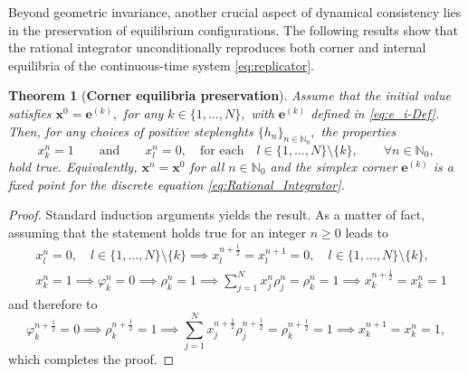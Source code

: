 \documentclass[11pt,letterpaper]{article}
\newtheorem{theorem}{Theorem}[section]
\theoremstyle{remark}
\begin{document}
Beyond geometric invariance, another crucial aspect of dynamical consistency lies in the preservation of equilibrium configurations. The following results show that the rational integrator unconditionally reproduces both corner and internal equilibria of the continuous-time system \eqref{eq:replicator}.

\begin{theorem}[\textbf{Corner equilibria preservation}]\label{thm:Corner_equilibria}
     Assume that the initial value satisfies $\bm{x}^0=\bm{e}^{(k)},$ for any $k\in \{1,\dots,N\},$ with $\bm{e}^{(k)}$ defined in \eqref{eq:e_i-Def}. Then, for any choices of positive steplenghts $\{h_n\}_{n\in \mathbb{N}_0},$ the properties
     \begin{equation*}
         x_k^{n}=1 \qquad \text{and} \qquad x_l^{n}=0, \quad \text{for each} \quad l\in\{1,\dots,N\}\setminus\{k\}, \qquad  \forall n\in \mathbb{N}_0,
    \end{equation*}
    hold true. Equivalently, $\bm{x}^n=\bm{x}^0$ for all $n\in\mathbb{N}_0$ and the simplex corner $\bm{e}^{(k)}$ is a fixed point for the discrete equation \eqref{eq:Rational_Integrator}. 
\end{theorem}
\begin{proof}
    Standard induction arguments yields the result. As a matter of fact, assuming that the statement holds true for an integer $n\geq 0$ leads to 
    \begin{equation*}
        \begin{split}
        & x_l^{n}=0, \quad l\in\{1,\dots,N\}\setminus\{k\}\implies x_l^{n+\frac{1}{2}}=x_l^{n+1}=0, \quad l\in\{1,\dots,N\}\setminus\{k\}, \\
        & x_k^{n}=1 \implies \varphi^n_k=0 \implies \rho_k^{n}=1 \implies\sum_{j=1}^Nx_j^n\rho_j^n=\rho_k^{n}=1 \implies x_k^{n+\frac{1}{2}}=x_k^n=1
        \end{split}
    \end{equation*}
    and therefore to
    \begin{equation*}
        \varphi^{n+\frac{1}{2}}_k=0 \implies \rho_k^{n+\frac{1}{2}}=1 \implies\sum_{j=1}^Nx_j^{n+\frac{1}{2}}\rho_j^{n+\frac{1}{2}}=\rho_k^{n+\frac{1}{2}}=1 \implies x_k^{n+1}=x_k^n=1,
    \end{equation*}
    which completes the proof.
\end{proof}
\end{document}
